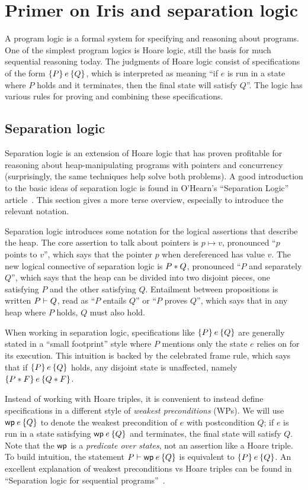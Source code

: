 \section{Primer on Iris and separation logic}

A program logic is a formal system for specifying and reasoning about programs.
One of the simplest program logics is Hoare logic, still the basis for much
sequential reasoning today. The judgments of Hoare logic consist of
specifications of the form $\hoare{P}{e}{Q}$, which is interpreted as meaning
``if $e$ is run in a state where $P$ holds and it terminates, then the final
state will satisfy $Q$''. The logic has various rules for proving and combining
these specifications.

\subsection{Separation logic}

Separation logic is an extension of Hoare logic that has proven profitable for
reasoning about heap-manipulating programs with pointers and concurrency
(surprisingly, the same techniques help solve both problems). A good
introduction to the basic ideas of separation logic is found in O'Hearn's
``Separation Logic'' article~\cite{ohearn:seplogic}. This section gives a more
terse overview, especially to introduce the relevant notation.

Separation logic introduces some notation for the logical assertions that
describe the heap. The core assertion to talk about pointers is $p \mapsto v$,
pronounced ``$p$ points to $v$'',
which says that the pointer $p$ when dereferenced has value $v$. The new logical
connective of separation logic is
$P * Q$, pronounced ``$P$ and separately $Q$'', which says that the heap can
be divided into two disjoint pieces, one satisfying $P$ and the other satisfying
$Q$. Entailment between propositions is written $P \vdash Q$, read as ``$P$
entails $Q$'' or ``$P$ proves $Q$'', which says that in any heap where $P$
holds, $Q$ must also hold.

When working in separation logic, specifications like $\hoare{P}{e}{Q}$ are
generally stated in a ``small footprint'' style where $P$ mentions only the
state $e$ relies on for its execution. This intuition is backed by the
celebrated frame rule, which says that if $\hoare{P}{e}{Q}$ holds, any disjoint
state is unaffected, namely $\hoare{P \sep F}{e}{Q \sep F}$.

Instead of working with Hoare triples, it is convenient to instead define
specifications in a different style of \emph{weakest preconditions} (WPs). We will use
$\wpre{e}{Q}$ to denote the weakest precondition of $e$ with postcondition $Q$;
if $e$ is run in a state satisfying $\wpre{e}{Q}$ and terminates, the final
state will satisfy $Q$. Note that the $\textsf{\upshape wp}$ is a \emph{predicate over
states}, not an assertion like a Hoare triple. To build intuition, the statement
$P \proves \wpre{e}{Q}$ is equivalent to $\hoare{P}{e}{Q}$. An excellent
explanation of weakest preconditions vs Hoare triples can be found in
``Separation logic for sequential programs''~\cite{chargueraud:seq-seplogic}.


